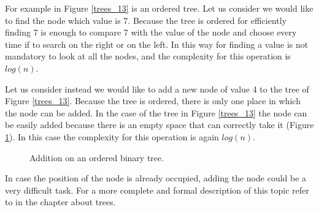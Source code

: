 For example in Figure \ref{trees_13} is an ordered tree. Let us consider we would like to find the node which value is 7. Because the tree is ordered for efficiently finding 7 is enough to compare 7 with the value of the node and choose every time if to search on the right or on the left. In this way for finding a value is not mandatory to look at all the nodes, and the complexity for this operation is \(log(n)\).

Let us consider instead we would like to add a new node of value 4 to the tree of Figure \ref{trees_13}. Because the tree is ordered, there is only one place in which the node can be added. In the case of the tree in Figure \ref{trees_13} the node can be easily added because there is an empty space that can correctly take it (Figure \ref{trees_14}). In this case the complexity for this operation is again \(log(n)\).

\begin{figure}[H]
\centering
{}
\caption[Addition on an ordered binary tree.]{Addition on an ordered binary tree.}
\label{trees_14}
\end{figure}

In case the position of the node is already occupied, adding the node could be a very difficult task. For a more complete and formal description of this topic refer to \cite{goodrich2013data} in the chapter about trees.

